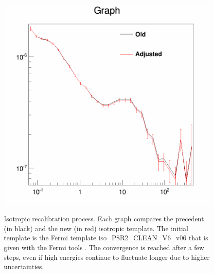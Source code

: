 \begin{figure}[H]
\begin{minipage}[h]{0.45\textwidth}
 	\subcaption{}
  	\label{app:app_iso_process_3}
  \end{minipage}
  \hfill
  \begin{minipage}[h]{0.45\textwidth}
  	\centering
	\includegraphics[width=1\linewidth]{pic/method/app_iso_process_4.png}
  	\subcaption{}
  	\label{app:app_iso_process_4}
  \end{minipage}
  \caption{Isotropic recalibration process. Each graph compares the precedent (in black) and the new (in red) isotropic template. The initial template is the Fermi template iso_P8R2_CLEAN_V6_v06 that is given with the Fermi tools . The convergence is reached after a few steps, even if high energies continue to fluctuate longer due to higher uncertainties.}
  \label{app:app_iso_process}
\end{figure}
\cite{FermiTools}

